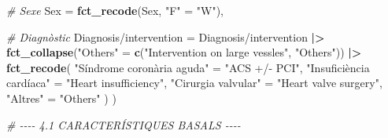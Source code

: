 \documentclass[CAT]{TFUOC}%
\newenvironment{Shaded}{\begin{snugshade}}{\end{snugshade}}
\newcommand{\AttributeTok}[1]{\textcolor[rgb]{0.13,0.29,0.53}{#1}}
\newcommand{\CommentTok}[1]{\textcolor[rgb]{0.56,0.35,0.01}{\textit{#1}}}
\newcommand{\FunctionTok}[1]{\textcolor[rgb]{0.13,0.29,0.53}{\textbf{#1}}}
\newcommand{\NormalTok}[1]{#1}
\newcommand{\OtherTok}[1]{\textcolor[rgb]{0.56,0.35,0.01}{#1}}
\newcommand{\SpecialCharTok}[1]{\textcolor[rgb]{0.81,0.36,0.00}{\textbf{#1}}}
\newcommand{\StringTok}[1]{\textcolor[rgb]{0.31,0.60,0.02}{#1}}
\begin{document}
\begin{Shaded}
\begin{Highlighting}[]
    \CommentTok{\# Sexe}
    \AttributeTok{Sex =} \FunctionTok{fct\_recode}\NormalTok{(Sex, }\StringTok{"F"} \OtherTok{=} \StringTok{"W"}\NormalTok{),}
    
    \CommentTok{\# Diagnòstic}
    \StringTok{\textasciigrave{}}\AttributeTok{Diagnosis/intervention}\StringTok{\textasciigrave{}} \OtherTok{=} \StringTok{\textasciigrave{}}\AttributeTok{Diagnosis/intervention}\StringTok{\textasciigrave{}} \SpecialCharTok{|\textgreater{}} 
      \FunctionTok{fct\_collapse}\NormalTok{(}\StringTok{"Others"} \OtherTok{=} \FunctionTok{c}\NormalTok{(}\StringTok{"Intervention on large vessles"}\NormalTok{, }\StringTok{"Others"}\NormalTok{)) }\SpecialCharTok{|\textgreater{}} 
      \FunctionTok{fct\_recode}\NormalTok{(}
        \StringTok{"Síndrome coronària aguda"} \OtherTok{=} \StringTok{"ACS +/{-} PCI"}\NormalTok{, }
        \StringTok{"Insuficiència cardíaca"} \OtherTok{=} \StringTok{"Heart insufficiency"}\NormalTok{, }
        \StringTok{"Cirurgia valvular"} \OtherTok{=} \StringTok{"Heart valve surgery"}\NormalTok{, }
        \StringTok{"Altres"} \OtherTok{=} \StringTok{"Others"}
\NormalTok{      )}
\NormalTok{  )}

\CommentTok{\# {-}{-}{-}{-} 4.1 CARACTERÍSTIQUES BASALS {-}{-}{-}{-}}


\end{Highlighting}
\end{Shaded}
\end{document}
